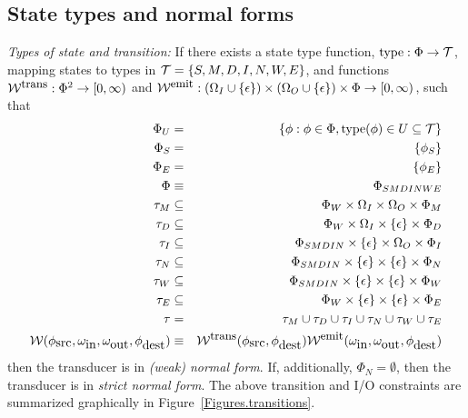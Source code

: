 \documentclass{article}
\newcommand{\seclabel}[1]{\label{sec.#1}}
\newcommand{\figref}[1]{Figure~\ref{Figures.#1}}
\newcommand\gappedalphabet[1]{(\Omega_{#1} \cup \{\epsilon\})}
\newcommand\gappedpair[2]{\gappedalphabet{#1} \times \gappedalphabet{#2}}
\newcommand\States{\Phi}
\newcommand\Transitions{\tau}
\newcommand\startstate{\phi_S}
\newcommand\laststate{\phi_E}
\newcommand\weight{{\cal W}}
\newcommand\weightfunof[1]{\weight_{#1}}
\newcommand\transweightfun[1]{\weightfunof{#1}^{\mbox{\small trans}}}
\newcommand\emitweightfun[1]{\weightfunof{#1}^{\mbox{\small emit}}}
\newcommand\statesoftype[1]{\States_{#1}}
\newcommand\statetype{\mbox{type}}
\begin{document}
\subsection{State types and normal forms}
\seclabel{StateTypes}
{\em Types of state and transition:}
If there exists a state type function, $\statetype:\States \to {\cal T}$, mapping states to types in ${\cal T} = \{S,M,D,I,N,W,E\}$,
and functions $\transweightfun{}: \States^2 \to [0,\infty)$ and $\emitweightfun{}: \gappedpair{I}{O} \times \States \to [0,\infty)$,
such that
\begin{eqnarray*}
\States_U & = & \{ \phi: \phi\in\States, \statetype(\phi) \in U \subseteq {\cal T} \} \\
\statesoftype{S} & = & \{ \startstate \} \\
\statesoftype{E} & = & \{ \laststate \} \\
\States & \equiv & \statesoftype{SMDINWE} \\   
\Transitions_M & \subseteq & \statesoftype{W} \times \Omega_I \times \Omega_O \times \statesoftype{M} \\
\Transitions_D & \subseteq & \statesoftype{W} \times \Omega_I \times \{\epsilon\} \times \statesoftype{D} \\
\Transitions_I & \subseteq & \statesoftype{SMDIN} \times \{\epsilon\} \times \Omega_O \times \statesoftype{I} \\
\Transitions_N & \subseteq & \statesoftype{SMDIN} \times \{\epsilon\} \times \{\epsilon\} \times \statesoftype{N} \\
\Transitions_W & \subseteq & \statesoftype{SMDIN} \times \{\epsilon\} \times \{\epsilon\} \times \statesoftype{W} \\
\Transitions_E & \subseteq & \statesoftype{W} \times \{\epsilon\} \times \{\epsilon\} \times \statesoftype{E} \\
\Transitions & = & \Transitions_M \cup \Transitions_D \cup \Transitions_I \cup \Transitions_N \cup \Transitions_W \cup \Transitions_E \\
\weight(\phi_{\mbox{src}},\omega_{\mbox{in}},\omega_{\mbox{out}},\phi_{\mbox{dest}}) & \equiv & \transweightfun{}(\phi_{\mbox{src}},\phi_{\mbox{dest}}) \emitweightfun{}(\omega_{\mbox{in}},\omega_{\mbox{out}},\phi_{\mbox{dest}})
\end{eqnarray*}
then the transducer is in {\em (weak) normal form}.
If, additionally, $\statesoftype{N} = \emptyset$, then the transducer is in {\em strict normal form}.
The above transition and I/O constraints are summarized graphically in \figref{transitions}. 
\end{document}
